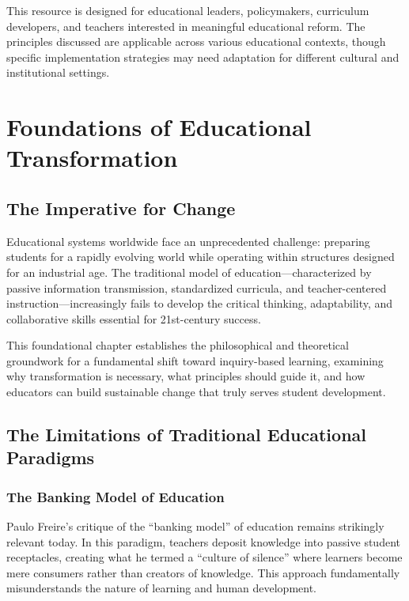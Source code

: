 \documentclass[
  Letterpaper,
]{scrbook}
\begin{document}

This resource is designed for educational leaders, policymakers,
curriculum developers, and teachers interested in meaningful educational
reform. The principles discussed are applicable across various
educational contexts, though specific implementation strategies may need
adaptation for different cultural and institutional settings.


\chapter{Foundations of Educational
Transformation}\label{foundations-of-educational-transformation}

\section{The Imperative for Change}\label{the-imperative-for-change}

Educational systems worldwide face an unprecedented challenge: preparing
students for a rapidly evolving world while operating within structures
designed for an industrial age. The traditional model of
education---characterized by passive information transmission,
standardized curricula, and teacher-centered instruction---increasingly
fails to develop the critical thinking, adaptability, and collaborative
skills essential for 21st-century success.

This foundational chapter establishes the philosophical and theoretical
groundwork for a fundamental shift toward inquiry-based learning,
examining why transformation is necessary, what principles should guide
it, and how educators can build sustainable change that truly serves
student development.

\section{The Limitations of Traditional Educational
Paradigms}\label{the-limitations-of-traditional-educational-paradigms}

\subsection{The Banking Model of
Education}\label{the-banking-model-of-education}

Paulo Freire's critique of the ``banking model'' of education remains
strikingly relevant today. In this paradigm, teachers deposit knowledge
into passive student receptacles, creating what he termed a ``culture of
silence'' where learners become mere consumers rather than creators of
knowledge. This approach fundamentally misunderstands the nature of
learning and human development.
\end{document}

